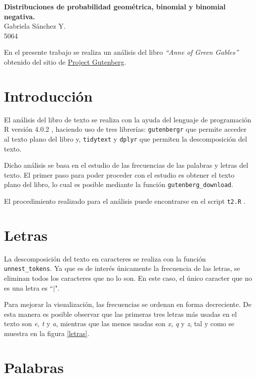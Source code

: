 \documentclass[12pt]{article}
\begin{document}
	\thispagestyle{empty}

	\begin{center}
		{\Large \bf Distribuciones de probabilidad geométrica, binomial y binomial negativa.}\\
		Gabriela S\'anchez Y.\\
		5064
	\end{center}

	En el presente trabajo se realiza un análisis del libro \textit{``Anne of Green Gables''} obtenido del sitio de \href{http://www.gutenberg.org/}{Project Gutenberg}. 

	\section{Introducción}
	
	El análisis del libro de texto se realiza con la ayuda del lenguaje de programación \textsc{R} versión 4.0.2 \cite{r}, haciendo uso de tres librerías: \texttt{gutenbergr} que permite acceder al texto plano del libro y, \texttt{tidytext} y \texttt{dplyr} que permiten la descomposición del texto.

	Dicho análisis se basa en el estudio de las frecuencias de las palabras y letras del texto. El primer paso para poder proceder con el estudio es obtener el texto plano del libro, lo cual es posible mediante la función \texttt{gutenberg\_download}.  
	
	El procedimiento realizado para el análisis puede encontrarse en el script \texttt{t2.R} \cite{mpa_gaby}.

	\section{Letras}
	
	La descomposición del texto en caracteres se realiza con la función \texttt{unnest\_tokens}. Ya que es de interés únicamente la frecuencia de las letras, se eliminan todos los caracteres que no lo son. En este caso, el único caracter que no es una letra es ``$\mid$". 
	
	Para mejorar la visualización, las frecuencias se ordenan en forma decreciente. De esta manera es posible observar que las primeras tres letras más usadas en el texto son \textit{e, t} y \textit{a}, mientras que las menos usadas son \textit{x, q} y \textit{z}, tal y como se muestra en la figura \ref{letras}.

	\section{Palabras}
	
\end{document}
